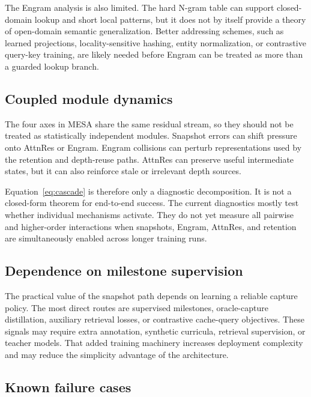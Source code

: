 \documentclass[11pt]{article}
\begin{document}
The Engram analysis is also limited. The hard N-gram table can support closed-domain lookup and short local patterns, but it does not by itself provide a theory of open-domain semantic generalization. Better addressing schemes, such as learned projections, locality-sensitive hashing, entity normalization, or contrastive query-key training, are likely needed before Engram can be treated as more than a guarded lookup branch.

\subsection{Coupled module dynamics}

The four axes in MESA share the same residual stream, so they should not be treated as statistically independent modules. Snapshot errors can shift pressure onto AttnRes or Engram. Engram collisions can perturb representations used by the retention and depth-reuse paths. AttnRes can preserve useful intermediate states, but it can also reinforce stale or irrelevant depth sources.

Equation~\eqref{eq:cascade} is therefore only a diagnostic decomposition. It is not a closed-form theorem for end-to-end success. The current diagnostics mostly test whether individual mechanisms activate. They do not yet measure all pairwise and higher-order interactions when snapshots, Engram, AttnRes, and retention are simultaneously enabled across longer training runs.

\subsection{Dependence on milestone supervision}

The practical value of the snapshot path depends on learning a reliable capture policy. The most direct routes are supervised milestones, oracle-capture distillation, auxiliary retrieval losses, or contrastive cache-query objectives. These signals may require extra annotation, synthetic curricula, retrieval supervision, or teacher models. That added training machinery increases deployment complexity and may reduce the simplicity advantage of the architecture.

\subsection{Known failure cases}
\end{document}
